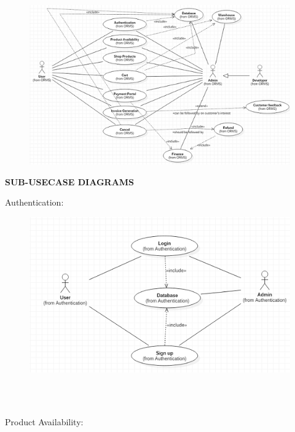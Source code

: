 \documentclass{tcc}
\begin{document}
\begin{figure}[H]
\centering
\includegraphics{images/usecase.png}\\
\end{figure}
\begin{center}
\textbf{\Large{SUB-USECASE DIAGRAMS}}
\end{center}
\begin{flushleft}
\Large{{\selectfont
Authentication:
}}
\end{flushleft}
\begin{figure}[H]
\centering
\includegraphics{images/authentication.PNG}\\
\end{figure}
\ \\ \\
\begin{flushleft}
\Large{{\selectfont
Product Availability:
}}
\end{flushleft}
\end{document}
